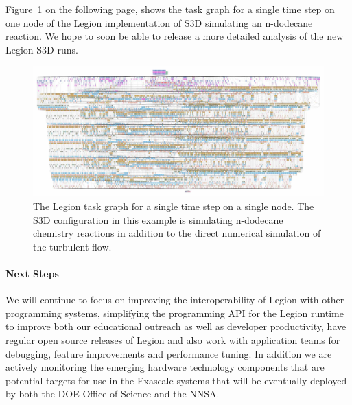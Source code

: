 Figure~\ref{fig:task-graph} on the following page, shows the task graph for a single time 
step on one node of the Legion implementation of S3D simulating an n-dodecane reaction.  
We hope to soon be able to release a more detailed analysis of the new Legion-S3D runs. 

\begin{figure}[htb]
	\centering
	\includegraphics[width=6.5in]{projects/2.3.1-PMR/2.3.1.08-Legion/tg}
	\caption{\label{fig:task-graph}The Legion task graph for a single time step on a 
	single node.  The S3D configuration in this example is simulating n-dodecane 
	chemistry reactions in addition to the direct numerical simulation of the 
	turbulent flow.}
\end{figure}

\paragraph{Next Steps}
We will continue to focus on improving the interoperability of Legion with other programming
systems, simplifying the programming API for the Legion runtime to improve both our educational 
outreach as well as developer productivity, have regular open source releases of Legion and
also work with application teams for debugging, feature improvements and performance 
tuning.  In addition we are actively monitoring the emerging hardware technology components
that are potential targets for use in the Exascale systems that will be eventually deployed 
by both the DOE Office of Science and the NNSA. 
